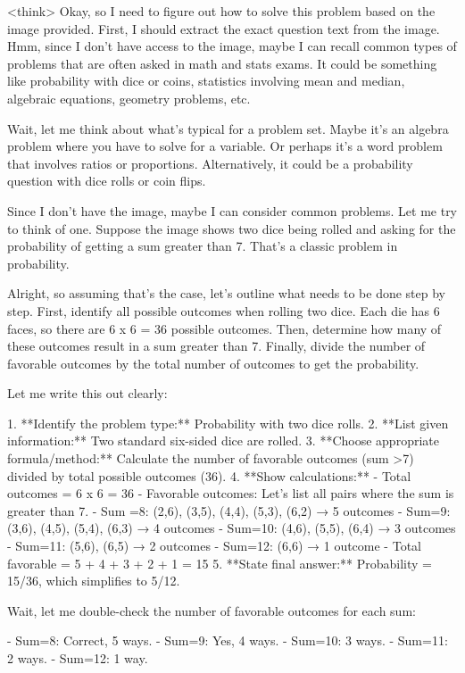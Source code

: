 <think>
Okay, so I need to figure out how to solve this problem based on the image provided. First, I should extract the exact question text from the image. Hmm, since I don't have access to the image, maybe I can recall common types of problems that are often asked in math and stats exams. It could be something like probability with dice or coins, statistics involving mean and median, algebraic equations, geometry problems, etc.

Wait, let me think about what's typical for a problem set. Maybe it's an algebra problem where you have to solve for a variable. Or perhaps it's a word problem that involves ratios or proportions. Alternatively, it could be a probability question with dice rolls or coin flips. 

Since I don't have the image, maybe I can consider common problems. Let me try to think of one. Suppose the image shows two dice being rolled and asking for the probability of getting a sum greater than 7. That's a classic problem in probability.

Alright, so assuming that's the case, let's outline what needs to be done step by step. First, identify all possible outcomes when rolling two dice. Each die has 6 faces, so there are 6 x 6 = 36 possible outcomes. Then, determine how many of these outcomes result in a sum greater than 7. Finally, divide the number of favorable outcomes by the total number of outcomes to get the probability.

Let me write this out clearly:

1. **Identify the problem type:** Probability with two dice rolls.
2. **List given information:** Two standard six-sided dice are rolled.
3. **Choose appropriate formula/method:** Calculate the number of favorable outcomes (sum >7) divided by total possible outcomes (36).
4. **Show calculations:**
   - Total outcomes = 6 x 6 = 36
   - Favorable outcomes: Let's list all pairs where the sum is greater than 7.
     - Sum =8: (2,6), (3,5), (4,4), (5,3), (6,2) → 5 outcomes
     - Sum=9: (3,6), (4,5), (5,4), (6,3) → 4 outcomes
     - Sum=10: (4,6), (5,5), (6,4) → 3 outcomes
     - Sum=11: (5,6), (6,5) → 2 outcomes
     - Sum=12: (6,6) → 1 outcome
   - Total favorable = 5 + 4 + 3 + 2 + 1 = 15
5. **State final answer:** Probability = 15/36, which simplifies to 5/12.

Wait, let me double-check the number of favorable outcomes for each sum:

- Sum=8: Correct, 5 ways.
- Sum=9: Yes, 4 ways.
- Sum=10: 3 ways.
- Sum=11: 2 ways.
- Sum=12: 1 way.

